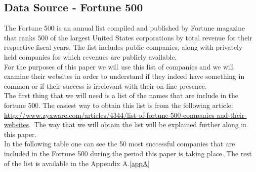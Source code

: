 \documentclass{article}
\begin{document}
\subsection{Data Source - Fortune 500}\label{ds:f500}
The Fortune 500 is an annual list compiled and published by Fortune magazine that ranks 500 of the largest United States corporations by total revenue for their respective fiscal years. The list includes public companies, along with privately held companies for which revenues are publicly available.\cite{key1, key2}\\ 
For the purposes of this paper we will use this list of companies and we will examine their websites in order to understand if they indeed have something in common or if their success is irrelevant with their on-line presence.\\
The first thing that we will need is a list of the names that are include in the fortune 500. The easiest way to obtain this list is from the following article:
\href{url}{http://www.zyxware.com/articles/4344/list-of-fortune-500-companies-and-their-websites}.\ The way that we will obtain the list will be explained further along in this paper.\\
In the following table one can see the 50 most successful companies that are included in the Fortune 500 during the period this paper is taking place. The rest of the list is available in the Appendix A.\ref{appA}
\end{document}

